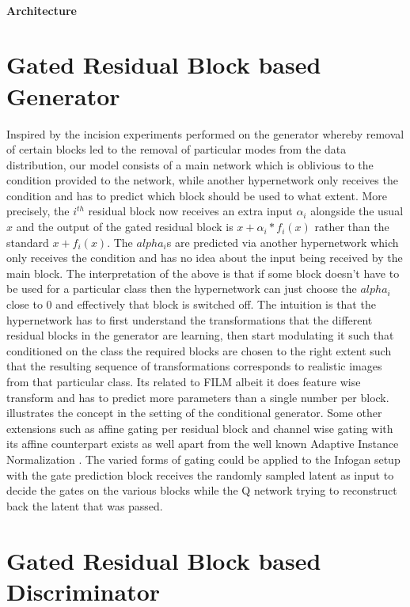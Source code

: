 
\paragraph{Architecture}

\section{Gated Residual Block based Generator}
Inspired by the incision experiments performed on the generator whereby removal of certain blocks led to the removal of particular modes from the data distribution, our model consists of a main network which is oblivious to the condition provided to the network, while another hypernetwork only receives the condition and has to predict which block should be used to what extent. More precisely, the $i^{th}$ residual block now receives an extra input $\alpha_i$ alongside the usual $x$ and the output of the gated residual block is $x+\alpha_i*f_i(x)$ rather than the standard $x+f_i(x)$. The $alpha_i$s are predicted via another hypernetwork which only receives the condition and has no idea about the input being received by the main block. The interpretation of the above is that if some block doesn't have to be used for a particular class then the hypernetwork can just choose the $alpha_i$ close to 0 and effectively that block is switched off. The intuition is that the hypernetwork has to first understand the transformations that the different residual blocks in the generator are learning, then start modulating it such that conditioned on the class the required blocks are chosen to the right extent such that the resulting sequence of transformations corresponds to realistic images from that particular class. Its related to FILM \cite{perez2017film} albeit it does feature wise transform and has to predict more parameters than a single number per block.  illustrates the concept in the setting of the conditional generator. Some other extensions such as affine gating per residual block and channel wise gating with its affine counterpart exists as well apart from the well known Adaptive Instance Normalization \cite{huang2017arbitrary} . The varied forms of gating could be applied to the Infogan setup with the gate prediction block receives the randomly sampled latent as input to decide the gates on the various blocks while the Q network trying to reconstruct back the latent that was passed.
 
\section{Gated Residual Block based Discriminator}

